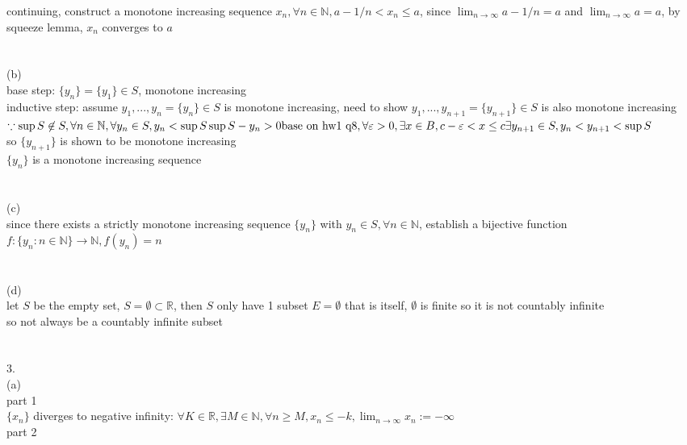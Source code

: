 \documentclass[12pt, border = 4pt, multi]{article} %
\begin{document}
continuing, construct a monotone increasing sequence $x_n, \forall n \in \mathbb{N}, a - 1 / n < x_n \leq a$, since $\lim_{n \rightarrow \infty} a - 1 / n = a$ and $\lim_{n \rightarrow \infty} a = a$, by squeeze lemma, $x_n$ converges to $a$\\
\\
\\
(b)\\
base step: $\{y_n\} = \{y_1\} \in S$, monotone increasing\\
inductive step: assume $y_1, ..., y_n = \{y_n\} \in S$ is monotone increasing, need to show $y_1, ..., y_{n + 1} = \{y_{n + 1}\} \in S$ is also monotone increasing\\
$\because \sup S \not\in S, \forall n \in \mathbb{N}, \forall y_n \in S, y_n < \sup S \\
\sup S - y_n > 0\\
\text{base on hw1 q8}, \forall \varepsilon > 0, \exists x \in B, c - \varepsilon < x \leq c\\
\exists y_{n + 1} \in S, y_n < y_{n + 1} < \sup S$\\
so $\{y_{n + 1}\}$ is shown to be monotone increasing\\
$\{y_n\}$ is a monotone increasing sequence\\
\\
\\
(c)\\
since there exists a strictly monotone increasing sequence $\{y_n\}$ with $y_n \in S, \forall n \in \mathbb{N}$, establish a bijective function $f: \{y_n : n \in \mathbb{N}\} \rightarrow \mathbb{N}, f(y_n) = n$\\
\\
\\
(d)\\
let $S$ be the empty set, $S = \emptyset \subset \mathbb{R}$, then $S$ only have 1 subset $E = \emptyset$ that is itself, $\emptyset$ is finite so it is not countably infinite\\
so not always be a countably infinite subset\\
\\
\\
3.\\
(a)\\
part 1\\
$\{x_n\}$ diverges to negative infinity: $\forall K \in \mathbb{R}, \exists M \in \mathbb{N}, \forall n \geq M, x_n \leq -k, \lim_{n \rightarrow \infty} x_n := -\infty$\\
part 2\\
\end{document}
